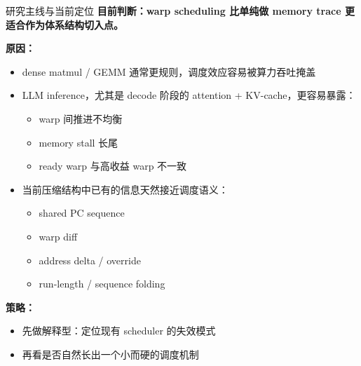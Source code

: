 \documentclass[aspectratio=169]{beamer}
\begin{document}
\begin{frame}{研究主线与当前定位}
\textbf{目前判断：warp scheduling 比单纯做 memory trace 更适合作为体系结构切入点。}

\vspace{0.6em}
\textbf{原因：}
\begin{itemize}
  \item dense matmul / GEMM 通常更规则，调度效应容易被算力吞吐掩盖
  \item LLM inference，尤其是 decode 阶段的 attention + KV-cache，更容易暴露：
  \begin{itemize}
    \item warp 间推进不均衡
    \item memory stall 长尾
    \item ready warp 与高收益 warp 不一致
  \end{itemize}
  \item 当前压缩结构中已有的信息天然接近调度语义：
  \begin{itemize}
    \item shared PC sequence
    \item warp diff
    \item address delta / override
    \item run-length / sequence folding
  \end{itemize}
\end{itemize}

\vspace{0.6em}
\textbf{策略：}
\begin{itemize}
  \item 先做解释型：定位现有 scheduler 的失效模式
  \item 再看是否自然长出一个小而硬的调度机制
\end{itemize}
\end{frame}
\end{document}

